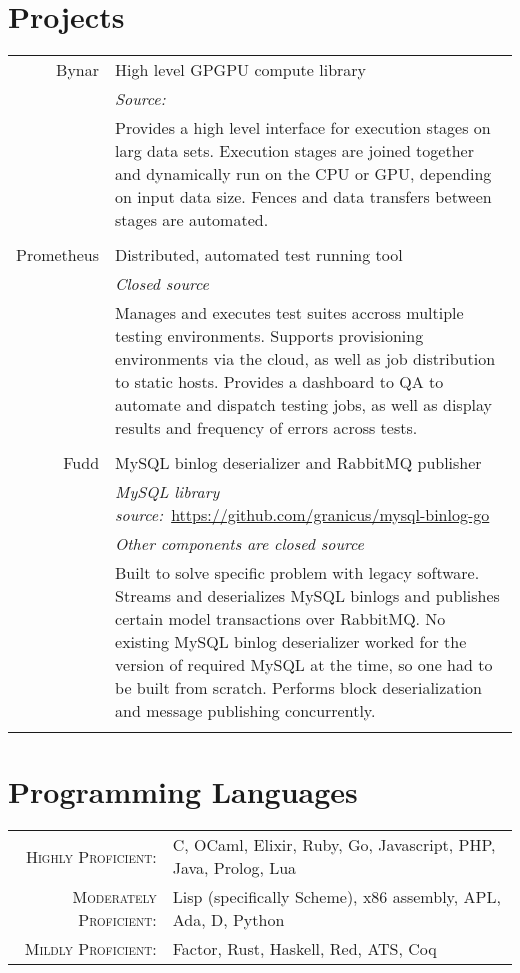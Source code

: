 \documentclass[a4paper,10pt]{article}
\begin{document}
\section{Projects}
\begin{tabular}{r|p{11cm}}
  Bynar       & High level GPGPU compute library\\
              & \emph{Source:}\ \href{}{}\\
              & \footnotesize{Provides a high level interface for execution stages on larg data sets. Execution stages are joined together and dynamically run on the CPU or GPU, depending on input data size. Fences and data transfers between stages are automated.}\\
  \multicolumn{2}{c}{}\\

  Prometheus  & Distributed, automated test running tool\\
              & \emph{Closed source}\\
              & \footnotesize{Manages and executes test suites accross multiple testing environments. Supports provisioning environments via the cloud, as well as job distribution to static hosts. Provides a dashboard to QA to automate and dispatch testing jobs, as well as display results and frequency of errors across tests.}\\
  \multicolumn{2}{c}{}\\

  Fudd        & MySQL binlog deserializer and RabbitMQ publisher\\
              & \emph{MySQL library source:}\ \href{https://github.com/granicus/mysql-binlog-go}{https://github.com/granicus/mysql-binlog-go}\\
              & \emph{Other components are closed source}\\
              & \footnotesize{Built to solve specific problem with legacy software. Streams and deserializes MySQL binlogs and publishes certain model transactions over RabbitMQ. No existing MySQL binlog deserializer worked for the version of required MySQL at the time, so one had to be built from scratch. Performs block deserialization and message publishing concurrently.}\\
  \multicolumn{2}{c}{}\\
\end{tabular}

\section{Programming Languages}
\begin{tabular}{rl}
  \textsc{Highly Proficient:}     & C, OCaml, Elixir, Ruby, Go, Javascript, PHP, Java, Prolog, Lua\\
  \textsc{Moderately Proficient:} & Lisp (specifically Scheme), x86 assembly, APL, Ada, D, Python\\
  \textsc{Mildly Proficient:}     & Factor, Rust, Haskell, Red, ATS, Coq\\
\end{tabular}
\end{document}
